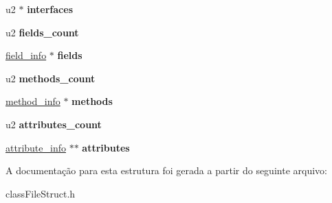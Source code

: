 \begin{DoxyCompactItemize}
u2 $\ast$ {\bfseries interfaces}
\item 
\mbox{\label{structclassFile_aab140aacadd635ec42e6117d90f7363a}} 
u2 {\bfseries fields\+\_\+count}
\item 
\mbox{\label{structclassFile_af08165230270046ef4f4dcc6fb8133ae}} 
\hyperlink{structfield__info}{field\+\_\+info} $\ast$ {\bfseries fields}
\item 
\mbox{\label{structclassFile_a8c3eb4279e03c8b8f6525b6dd0ff6126}} 
u2 {\bfseries methods\+\_\+count}
\item 
\mbox{\label{structclassFile_a5417beaa23b6e9d5329dbee87a1f5238}} 
\hyperlink{structmethod__info}{method\+\_\+info} $\ast$ {\bfseries methods}
\item 
\mbox{\label{structclassFile_a9c2f1bdfe0c43e7189f2a7100bec1966}} 
u2 {\bfseries attributes\+\_\+count}
\item 
\mbox{\label{structclassFile_a49c7b5a9f1718d9a883d3db7eb650757}} 
\hyperlink{structattribute__info}{attribute\+\_\+info} $\ast$$\ast$ {\bfseries attributes}
\end{DoxyCompactItemize}


A documentação para esta estrutura foi gerada a partir do seguinte arquivo\+:\begin{DoxyCompactItemize}
\item 
class\+File\+Struct.\+h\end{DoxyCompactItemize}

